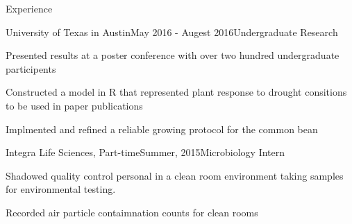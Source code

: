 \documentclass{resume} %
\begin{document}
    \begin{rSection}{Experience}
    
    \begin{rSubsection}{University of Texas in Austin}{May 2016 - Augest 2016}{Undergraduate Research}{}
    \item Presented results at a poster conference with over two hundred undergraduate participents
    \item Constructed a model in R that represented plant response to drought consitions to be used in paper publications
    \item Implmented and refined a reliable growing protocol for the common bean
    \end{rSubsection}

    
    \begin{rSubsection}{Integra Life Sciences, Part-time}{Summer, 2015}{Microbiology Intern}{}
    \item Shadowed quality control personal in a clean room environment taking samples for environmental testing.
    \item Recorded air particle contaimnation counts for clean rooms
    \end{rSubsection}
    \end{rSection}

    
    
\end{document}
